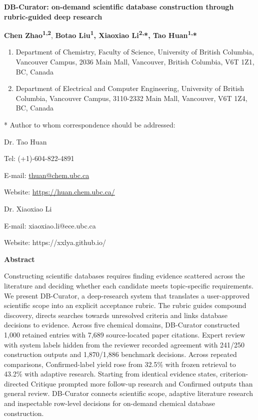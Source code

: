 \documentclass[
]{article}
\author{}
\date{}
\begin{document}
\textbf{DB-Curator: on-demand scientific database construction through rubric-guided deep research}

\textbf{Chen Zhao\textsuperscript{1,2}}, \textbf{Botao Liu\textsuperscript{1}, Xiaoxiao Li\textsuperscript{2,}*, Tao Huan\textsuperscript{1,}*}

\begin{enumerate}
\def\labelenumi{\arabic{enumi}.}
\item
  Department of Chemistry, Faculty of Science, University of British Columbia, Vancouver Campus, 2036 Main Mall, Vancouver, British Columbia, V6T 1Z1, BC, Canada
\item
  Department of Electrical and Computer Engineering, University of British Columbia, Vancouver Campus, 3110-2332 Main Mall, Vancouver, V6T 1Z4, BC, Canada
\end{enumerate}

* Author to whom correspondence should be addressed:

Dr. Tao Huan

Tel: (+1)-604-822-4891

E-mail: \href{mailto:thuan@chem.ubc.ca}{{thuan@chem.ubc.ca}}

Website: \href{https://huan.chem.ubc.ca/}{{https://huan.chem.ubc.ca/}}

Dr. Xiaoxiao Li

E-mail: xiaoxiao.li@ece.ubc.ca

Website: https://xxlya.github.io/

\textbf{Abstract}

Constructing scientific databases requires finding evidence scattered across the literature and deciding whether each candidate meets topic-specific requirements. We present DB-Curator, a deep-research system that translates a user-approved scientific scope into an explicit acceptance rubric. The rubric guides compound discovery, directs searches towards unresolved criteria and links database decisions to evidence. Across five chemical domains, DB-Curator constructed 1,000 retained entries with 7,689 source-located paper citations. Expert review with system labels hidden from the reviewer recorded agreement with 241/250 construction outputs and 1,870/1,886 benchmark decisions. Across repeated comparisons, Confirmed-label yield rose from 32.5\% with frozen retrieval to 43.2\% with adaptive research. Starting from identical evidence states, criterion-directed Critique prompted more follow-up research and Confirmed outputs than general review. DB-Curator connects scientific scope, adaptive literature research and inspectable row-level decisions for on-demand chemical database construction.
\end{document}
